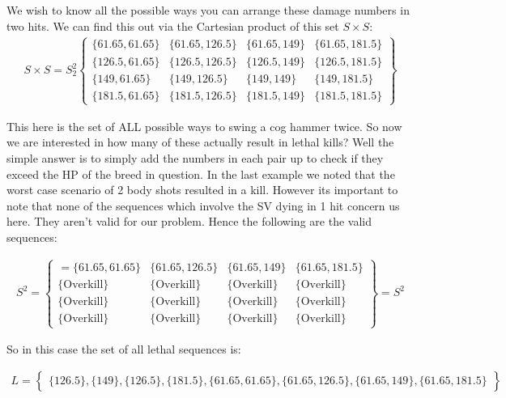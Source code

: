 \documentclass{article}
\begin{document}
We wish to know all the possible ways you can arrange these damage numbers in two hits. We can find this out via the Cartesian product of this set $S \times S$:
\begin{align*}
S \times S = S_{2}^{2} \begin{Bmatrix} 
\{61.65, 61.65\}  & \{61.65, 126.5\} & \{61.65, 149\} & \{61.65, 181.5\} \\
\{126.5, 61.65\}  & \{126.5, 126.5\} & \{126.5, 149\} & \{126.5, 181.5\} \\
\{149, 61.65\}    & \{149, 126.5\}   & \{149, 149\}     & \{149, 181.5\} \\
\{181.5, 61.65\}  & \{181.5, 126.5\} & \{181.5, 149\} & \{181.5, 181.5\}
\end{Bmatrix}
\end{align*}

This here is the set of ALL possible ways to swing a cog hammer twice. So now we are interested in how many of these actually result in lethal kills? Well the simple answer is to simply add the numbers in each pair up to check if they exceed the HP of the breed in question. In the last example we noted that the worst case scenario of 2 body shots resulted in a kill. However its important to note that none of the sequences which involve the SV dying in 1 hit concern us here. They aren't valid for our problem. Hence the following are the valid sequences:

\begin{align*}
S^2 = \begin{Bmatrix} =
\{61.65, 61.65\}  & \{61.65, 126.5\} & \{61.65, 149\} & \{61.65, 181.5\} \\
\{\text{Overkill}\}  & \{\text{Overkill}\} & \{\text{Overkill}\} & \{\text{Overkill}\} \\
\{\text{Overkill}\}    & \{\text{Overkill}\}   & \{\text{Overkill}\}     & \{\text{Overkill}\} \\
\{\text{Overkill}\}  & \{\text{Overkill}\} & \{\text{Overkill}\} & \{\text{Overkill}\}
\end{Bmatrix} = S^2
\end{align*}

So in this case the set of all lethal sequences is:

\begin{align*}
L = \begin{Bmatrix} \{126.5\},\{149\},\{126.5\},\{181.5\},\{61.65, 61.65\},\{61.65, 126.5\},\{61.65, 149\},\{61.65, 181.5\}
\end{Bmatrix}
\end{align*}
\end{document}
